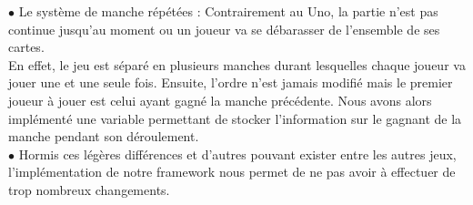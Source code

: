 \documentclass[12pt, letterpaper]{article}
\begin{document}
$\bullet$ Le système de manche répétées : Contrairement au Uno, la partie n'est pas continue jusqu'au moment ou un joueur va se débarasser de l'ensemble de ses cartes.\\
En effet, le jeu est séparé en plusieurs manches durant lesquelles chaque joueur va jouer une et une seule fois. Ensuite, l'ordre n'est jamais modifié mais le premier joueur à jouer
est celui ayant gagné la manche précédente. Nous avons alors implémenté une variable permettant de stocker l'information sur le gagnant de la manche pendant son déroulement.\\

$\bullet$ Hormis ces légères différences et d'autres pouvant exister entre les autres jeux, l'implémentation de notre framework nous permet de ne pas avoir à effectuer de trop nombreux changements.
\end{document}

